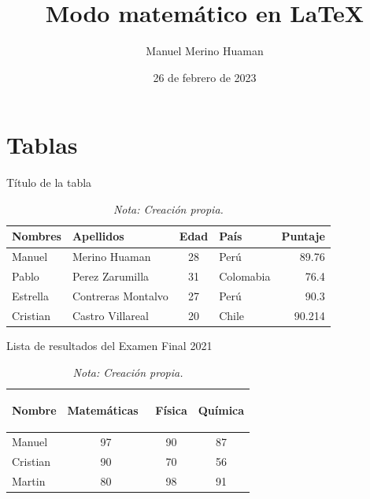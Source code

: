 \documentclass[a4paper, 11pt]{article}
\author{Manuel Merino Huaman}
\title{Modo matemático en \LaTeX}
\date{26 de febrero de 2023}
\begin{document}
    \maketitle

    \section{Tablas}
    
    \begin{table}[h]
        \raggedright
        \caption{Título de la tabla}
          \begin{tabular}{|l|l|c|l|r|}
             \hline
             Nombres & Apellidos & Edad & País & Puntaje  \\
             \hline
             Manuel & Merino Huaman& 28& Perú& 89.76\\
             Pablo & Perez Zarumilla& 31& Colomabia & 76.4\\
             Estrella & Contreras Montalvo & 27 & Perú & 90.3 \\
             Cristian & Castro Villareal& 20& Chile & 90.214 \\
            \hline
           \end{tabular}
         \vspace{2mm}
        \caption*{\it Nota: Creación propia.}  
        \label{tab: tabla prueba}
    \end{table}
    
    \begin{table}[!hbt]
        \raggedright
        \caption{Lista de resultados del Examen Final 2021}
            \begin{tabular}{|l|c|c|c|}
                \hline
                 Nombre  & \begin{sideways} Matemáticas \, \end{sideways}& \begin{sideways} Física \end{sideways}   &  \begin{sideways} Química \end{sideways}     \\
                \hline
                 Manuel & 97 & 90 & 87 \\
                \hline 
                 Cristian & 90 & 70 & 56 \\
                \hline
                 Martin &  80 & 98  & 91 \\
                \hline
            \end{tabular}
            
        \vspace{2mm}
        \caption*{\it Nota: Creación propia.}
        \label{tab: tabular-5}
    \end{table}
   
\end{document}
